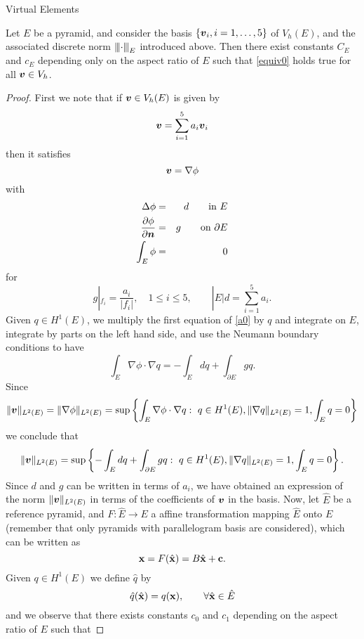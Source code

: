 \begin{chapter}{Virtual Elements}

\begin{proposition}
\label{stabilizing_term}
Let $E$ be a pyramid, and consider the basis $\{\boldsymbol{v}_i, i=1,\ldots,5\}$ of $V_h(E)$, and the associated discrete norm ${\left\vert\kern-0.25ex\left\vert\kern-0.25ex\left\vert \cdot \right\vert\kern-0.25ex\right\vert\kern-0.25ex\right\vert}_E$ introduced above. Then there exist constants $C_E$ and $c_E$ depending only on the aspect ratio of $E$ such that \eqref{equiv0} holds true for all $\boldsymbol{v}\in V_h$.
\end{proposition}
\begin{proof} First we note that if $\boldsymbol{v}\in V_h(E)$ is given by
\[
\boldsymbol{v} = \sum_{i=1}^5a_i\boldsymbol{v}_i
\]
then it satisfies
\[
\boldsymbol{v} = \nabla\phi
\]
with 
\begin{eqnarray}\label{a0}
\Delta\phi &=& d\qquad \mbox{in }E\\ \frac{\partial\phi}{\partial\boldsymbol{n}}&=& g\qquad\mbox{on }\partial E\nonumber\\ \int_E\phi&=&0\nonumber
\end{eqnarray}
for
\begin{equation}\label{ai}
g|_{f_i}=\frac{a_i}{|f_i|},\quad 1\le i\le5, \qquad |E|d=\sum_{i=1}^5a_i.
\end{equation}
Given $q\in H^1(E)$, we multiply  the first equation of \eqref{a0} by $q$ and integrate on $E$, integrate by parts on the left hand side, and use the Neumann boundary conditions to have
\[
\int_E\nabla\phi\cdot\nabla q = -\int_Edq + \int_{\partial E}gq.
\]
Since 
\[
\|\boldsymbol{v}\|_{L^2(E)}=\|\nabla\phi\|_{L^2(E)}=\sup\left\{\int_{E}\nabla\phi\cdot\nabla q: \,\, q\in H^1(E),\|\nabla q\|_{L^2(E)}=1,\int_Eq=0\right\}
\]
we conclude that
\begin{equation}\label{equi0}
\|\boldsymbol{v}\|_{L^2(E)}=\sup\left\{-\int_Edq + \int_{\partial E}gq: \,\, q\in H^1(E),\|\nabla q\|_{L^2(E)}=1,\int_Eq=0\right\}.
\end{equation}
Since $d$ and $g$ can be written in terms of $a_i$, we have obtained an expression of the norm $\|\boldsymbol{v}\|_{L^2(E)}$ in terms of the coefficients of $\boldsymbol{v}$ in the basis.
Now, let $\hat E$ be a reference pyramid, and $F:\hat E\to E$ a affine transformation mapping $\hat E$ onto $E$ (remember that only pyramids with parallelogram basis are considered), which can be written as
\[
{\bf x}=F(\hat{\bf x})=B\hat{\bf x}+{\bf c}.
\] 
Given $q\in H^1(E)$ we define $\hat q$ by
\[
\hat q(\hat{\bf x}) = q({\bf x}),\qquad \forall \hat{\bf x}\in \hat E
\] 
and we observe that there exists constants $c_0$ and $c_1$ depending on the aspect ratio of $E$ such that

\end{proof}
\end{chapter}
